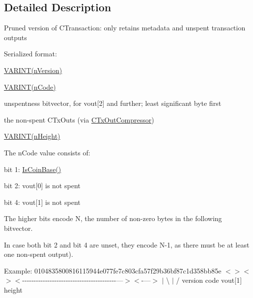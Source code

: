 \subsection{Detailed Description}
Pruned version of C\+Transaction\+: only retains metadata and unspent transaction outputs

Serialized format\+:
\begin{DoxyItemize}
\item \mbox{\hyperlink{serialize_8h_a1383f2a4c22ffaeba9b2924d90459f76}{V\+A\+R\+I\+N\+T(n\+Version)}}
\item \mbox{\hyperlink{serialize_8h_a1383f2a4c22ffaeba9b2924d90459f76}{V\+A\+R\+I\+N\+T(n\+Code)}}
\item unspentness bitvector, for vout\mbox{[}2\mbox{]} and further; least significant byte first
\item the non-\/spent C\+Tx\+Outs (via \mbox{\hyperlink{class_c_tx_out_compressor}{C\+Tx\+Out\+Compressor}})
\item \mbox{\hyperlink{serialize_8h_a1383f2a4c22ffaeba9b2924d90459f76}{V\+A\+R\+I\+N\+T(n\+Height)}}
\end{DoxyItemize}

The n\+Code value consists of\+:
\begin{DoxyItemize}
\item bit 1\+: \mbox{\hyperlink{class_c_coins_a976c1374c3398e1ee23b1110f1663895}{Is\+Coin\+Base()}}
\item bit 2\+: vout\mbox{[}0\mbox{]} is not spent
\item bit 4\+: vout\mbox{[}1\mbox{]} is not spent
\item The higher bits encode N, the number of non-\/zero bytes in the following bitvector.
\begin{DoxyItemize}
\item In case both bit 2 and bit 4 are unset, they encode N-\/1, as there must be at least one non-\/spent output).
\end{DoxyItemize}
\end{DoxyItemize}

Example\+: 0104835800816115944e077fe7c803cfa57f29b36bf87c1d358bb85e $<$$>$$<$$>$$<$-\/-\/-\/-\/-\/-\/-\/-\/-\/-\/-\/-\/-\/-\/-\/-\/-\/-\/-\/-\/-\/-\/-\/-\/-\/-\/-\/-\/-\/-\/-\/-\/-\/-\/-\/-\/-\/-\/-\/-\/-\/---$>$$<$-\/---$>$ $\vert$ \textbackslash{} $\vert$ / version code vout\mbox{[}1\mbox{]} height


